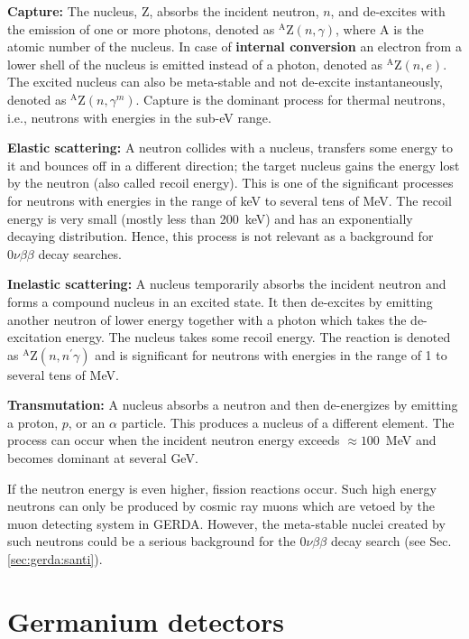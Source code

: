 \textbf{Capture:} The nucleus, Z, absorbs the incident neutron, $n$,
and de-excites with the emission of one or more photons, denoted as
$^{\text{A}}$Z$(n,\gamma)$, where A is the atomic number of the
nucleus. In case of \textbf{internal conversion} an electron from a
lower shell of the nucleus is emitted instead of a photon, denoted as
$^{\text{A}}$Z$(n,e)$. The excited nucleus can also be meta-stable and
not de-excite instantaneously, denoted as
$^{\text{A}}$Z$(n,\gamma^{m})$. Capture is the dominant process for
thermal neutrons, \textup{i.e.}, neutrons with energies in the sub-eV
range.

\textbf{Elastic scattering:} A neutron collides with a nucleus,
transfers some energy to it and bounces off in a different direction;
the target nucleus gains the energy lost by the neutron (also called
recoil energy). This is one of the significant processes for neutrons
with energies in the range of keV to several tens of MeV. The recoil
energy is very small (mostly less than 200~keV) and has an
exponentially decaying distribution. Hence, this process is not
relevant as a background for $0\nu\beta\beta$ decay searches.

\textbf{Inelastic scattering:} A nucleus temporarily absorbs the
incident neutron and forms a compound nucleus in an excited state. It
then de-excites by emitting another neutron of lower energy together
with a photon which takes the de-excitation energy. The nucleus takes
some recoil energy. The reaction is denoted as
$^{\text{A}}$Z$(n,n^{\prime}\gamma)$ and is significant for neutrons
with energies in the range of 1 to several tens of MeV.

\textbf{Transmutation:} A nucleus absorbs a neutron and then
de-energizes by emitting a proton, $p$, or an $\alpha$ particle. This
produces a nucleus of a different element. The process can occur when
the incident neutron energy exceeds $\approx 100$~MeV and becomes
dominant at several GeV.

If the neutron energy is even higher, fission reactions occur. Such
high energy neutrons can only be produced by cosmic ray muons which
are vetoed by the muon detecting system in GERDA. However, the
meta-stable nuclei created by such neutrons could be a serious
background for the $0\nu\beta\beta$ decay search (see
Sec.\ref{sec:gerda:santi}).


\section{Germanium detectors}
\label{sec:det:semi}


